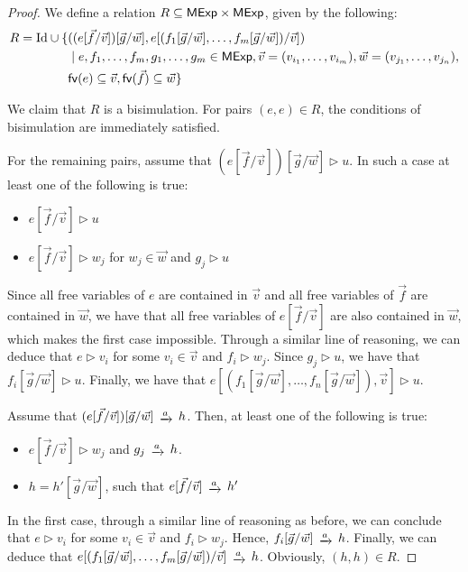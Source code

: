 \begin{proof}
	We define a relation ${R} \subseteq {\mathsf{MExp}\times \mathsf{MExp}}$, given by the following:
	\begin{align*}
		R = \text{Id} \cup \{&((e[\vec{f}/ \vec{v}])[\vec{g}/\vec{w}], e [(f_1[\vec{g}/\vec{w}], \dots, f_m[\vec{g}/\vec{w}])/\vec{v}])\\ &\mid e, f_1, \dots, f_m, g_1, \dots, g_m \in \mathsf{MExp}, \vec{v}=(v_{i_1}, \dots, v_{i_m}), \vec{w}=(v_{j_1}, \dots, v_{j_n}),\\ &\mathsf{fv}(e) \subseteq 		\vec{v},  \mathsf{fv}(\vec{f}) \subseteq \vec{w}\}
	\end{align*}

	
	 We claim that $R$ is a bisimulation. For pairs $(e,e) \in R$, the conditions of bisimulation are immediately satisfied. 
	
	For the remaining pairs, assume that $(e[\vec{f}/ \vec{v}])[\vec{g}/\vec{w}] \rhd u$. In such a case at least one of the following is true:
	\begin{itemize}
		\item $e[\vec{f}/ \vec{v}] \rhd u$
		\item $e[\vec{f}/\vec{v}] \rhd w_j$ for $w_j \in \vec{w}$ and $g_j \rhd u$
	\end{itemize}
	Since all free variables of $e$ are contained in $\vec{v}$ and all free variables of $\vec{f}$ are contained in $\vec{w}$, we have that all free variables of $e[\vec{f}/\vec{v}]$ are also contained in $\vec{w}$, which makes the first case impossible. Through a similar line of reasoning, we can deduce that $e \rhd v_i$ for some $v_i \in \vec{v}$ and $f_i \rhd w_j$. Since $g_j \rhd u$, we have that $f_i[\vec{g}/\vec{w}] \rhd u$. Finally, we have that $e[(f_1[\vec{g}/\vec{w}], \dots, f_n[\vec{g}/\vec{w}]), \vec{v}] \rhd u$.
	
	Assume that $(e[\vec{f}/ \vec{v}])[\vec{g}/\vec{w}] \tr{a} h$. Then, at least one of the following is true:
	\begin{itemize}
		\item $e[\vec{f}/\vec{v}] \rhd w_j$ and $g_j \tr{a} h$.
		\item $h = h'[\vec{g}/\vec{w}]$, such that $e[\vec{f}/\vec{v}] \tr{a} h'$ 
	\end{itemize}
	In the first case, through a similar line of reasoning as before, we can conclude that $e \rhd{ v_i}$ for some $v_i \in \vec{v}$ and $f_i \rhd w_j$. Hence, $f_i [\vec{g}/\vec{w}] \tr{a} h $. Finally, we can deduce that $e[(f_1[\vec{g}/\vec{w}], \dots, f_m[\vec{g}/\vec{w}])/\vec{v}] \tr{a} h$. Obviously, $(h,h) \in R$.
	

\end{proof}
